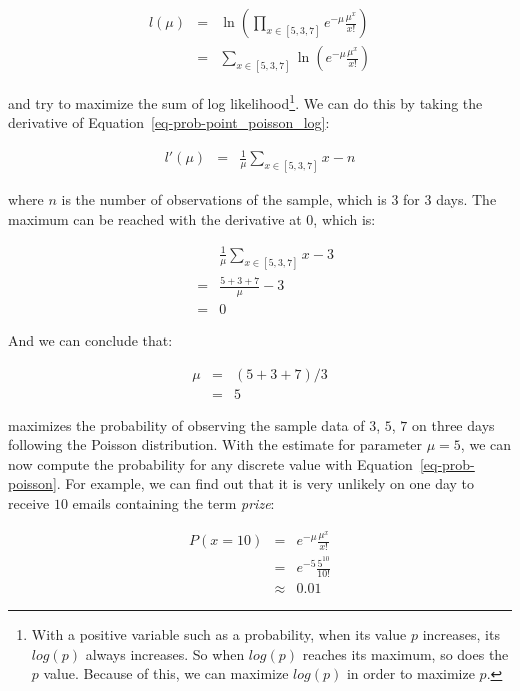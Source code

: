 \documentclass[
  letterpaper,
]{scrbook}
\begin{document}
\[\begin{aligned}
l(\mu) & = & \ln(\prod_{x \in [5,3,7]} e^{-\mu} \frac{\mu^x}{x!}) \\
& = & \sum_{x \in [5,3,7]} \ln(e^{-\mu} \frac{\mu^x}{x!})
\end{aligned}\]

and try to maximize the sum of log likelihood\footnote{With a positive
  variable such as a probability, when its value \(p\) increases, its
  \(log(p)\) always increases. So when \(log(p)\) reaches its maximum,
  so does the \(p\) value. Because of this, we can maximize \(log(p)\)
  in order to maximize \(p\).}. We can do this by taking the derivative
of
Equation~\hyperref[eq-prob-point_poisson_log]{{[}eq-prob-point\_poisson\_log{]}}:

\[\begin{aligned}
l'(\mu) & = & \frac{1}{\mu} \sum_{x \in [5,3,7]} x - n
\end{aligned}\]

where \(n\) is the number of observations of the sample, which is \(3\)
for 3 days. The maximum can be reached with the derivative at \(0\),
which is:

\[\begin{aligned}
  &   & \frac{1}{\mu} \sum_{x \in [5,3,7]} x - 3 \\
  & = & \frac{5+3+7}{\mu} - 3 \\
  & = & 0
\end{aligned}\]

And we can conclude that:

\[\begin{aligned}
\mu & = & (5 + 3 + 7) / 3 \\
    & = & 5
\end{aligned}\]

maximizes the probability of observing the sample data of \(3\), \(5\),
\(7\) on three days following the Poisson distribution. With the
estimate for parameter \(\mu=5\), we can now compute the probability for
any discrete value with
Equation~\hyperref[eq-prob-poisson]{{[}eq-prob-poisson{]}}. For example,
we can find out that it is very unlikely on one day to receive \(10\)
emails containing the term \emph{prize}:

\[\begin{aligned}
  P(x=10)
  & = & e^{-\mu} \frac{\mu^x}{x!} \\
  & = & e^{-5} \frac{5^{10}}{10!} \\
  & \approx & 0.01
\end{aligned}\]
\end{document}
